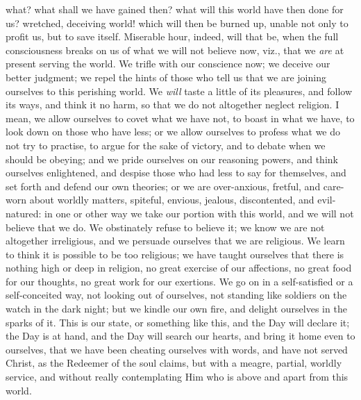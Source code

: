 what? what shall we have gained then? what will this world have then
done for us? wretched, deceiving world! which will then be burned up,
unable not only to profit us, but to save itself. Miserable hour,
indeed, will that be, when the full consciousness breaks on us of what
we will not believe now, viz., that we \emph{are} at present serving
the world. We trifle with our conscience now; we deceive our better
judgment; we repel the hints of those who tell us that we are joining
ourselves to this perishing world. We \emph{will} taste a little of
its pleasures, and follow its ways, and think it no harm, so that we
do not altogether neglect religion. I mean, we allow ourselves to
covet what we have not, to boast in what we have, to look down on
those who have less; or we allow ourselves to profess what we do not
try to practise, to argue for the sake of victory, and to debate when
we should be obeying; and we pride ourselves on our reasoning powers,
and think ourselves enlightened, and despise those who had less to say
for themselves, and set forth and defend our own theories; or we are
over-anxious, fretful, and care-worn about worldly matters, spiteful,
envious, jealous, discontented, and evil-natured: in one or other way
we take our portion with this world, and we will not believe that we
do. We obstinately refuse to believe it; we know we are not altogether
irreligious, and we persuade ourselves that we are religious. We learn
to think it is possible to be too religious; we have taught ourselves
that there is nothing high or deep in religion, no great exercise of
our affections, no great food for our thoughts, no great work for our
exertions. We go on in a self-satisfied or a self-conceited way, not
looking out of ourselves, not standing like soldiers on the watch in
the dark night; but we kindle our own fire, and delight ourselves in
the sparks of it. This is our state, or something like this, and the
Day will declare it; the Day is at hand, and the Day will search our
hearts, and bring it home even to ourselves, that we have been
cheating ourselves with words, and have not served Christ, as the
Redeemer of the soul claims, but with a meagre, partial, worldly
service, and without really contemplating Him who is above and apart
from this world.


